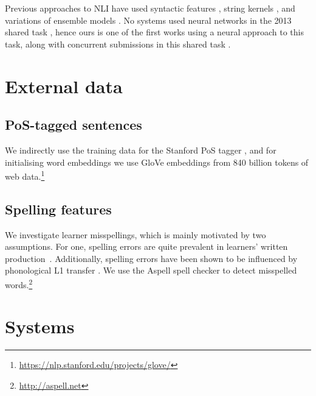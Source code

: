 \documentclass[11pt,letterpaper]{article}
\begin{document}
Previous approaches to NLI have used syntactic features \citep{bykh:2014}, string kernels \citep{ionescu:2014}, and variations of ensemble models \citep{malmasi:2017:nlisg,nli2013}.
No systems used neural networks in the 2013 shared task \citep{nli2013}, hence ours is one of the first works using a neural approach to this task, along with concurrent submissions in this shared task \citep{nli2017}.

\section{External data}

\subsection{PoS-tagged sentences}
We indirectly use the training data for the Stanford PoS tagger
\citep{Manning2014corenlp}, and for initialising word embeddings we use
GloVe embeddings from 840 billion tokens of web data.\footnote{\url{https://nlp.stanford.edu/projects/glove/}}

\subsection{Spelling features}
We investigate learner misspellings, which is mainly motivated by two assumptions.
For one, spelling errors are quite prevalent in learners' written production~\cite{kochmar2011}.
Additionally, spelling errors have been shown to be influenced by phonological L1 transfer \citep{grigonyte2014pronunciation}.
We use the Aspell spell checker to detect misspelled words.\footnote{\url{http://aspell.net}}

\section{Systems}
\end{document}
